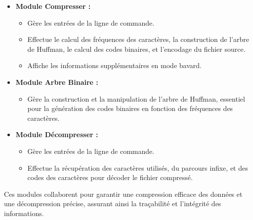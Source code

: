 \documentclass[12pt,a4paper]{article}
\begin{document}
\begin{itemize}
    \item \textbf{Module Compresser :} 
    \begin{itemize}
        \item Gère les entrées de la ligne de commande.
        \item Effectue le calcul des fréquences des caractères, la construction de l'arbre de Huffman, le calcul des codes binaires, et l'encodage du fichier source.
        \item Affiche les informations supplémentaires en mode bavard.
    \end{itemize}
    
    \item \textbf{Module Arbre Binaire :} 
    \begin{itemize}
        \item Gère la construction et la manipulation de l'arbre de Huffman, essentiel pour la génération des codes binaires en fonction des fréquences des caractères.
    \end{itemize}
    
    \item \textbf{Module Décompresser :} 
    \begin{itemize}
        \item Gère les entrées de la ligne de commande.
        \item Effectue la récupération des caractères utilisés, du parcours infixe, et des codes des caractères pour décoder le fichier compressé.
    \end{itemize}
\end{itemize}

Ces modules collaborent pour garantir une compression efficace des données et une décompression précise, assurant ainsi la traçabilité et l'intégrité des informations.
\end{document}
